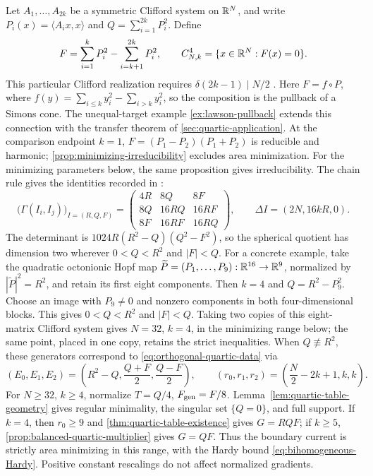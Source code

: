 Let \(A_1,\ldots,A_{2k}\) be a symmetric Clifford system on
\(\mathbb R^N\), and write
\(P_i(x)=\langle A_i x,x\rangle\) and
\(Q=\sum_{i=1}^{2k}P_i^2\). Define
\[
 F=\sum_{i=1}^{k}P_i^2-\sum_{i=k+1}^{2k}P_i^2,
 \qquad C^4_{N,k}=\{x\in\mathbb R^N:F(x)=0\}.
\]
This particular Clifford realization requires
$\delta(2k-1)\mid N/2$ \cite[Section~3.5]{FKM81}.
Here $F=f\circ P$, where
$f(y)=\sum_{i\leq k}y_i^2-\sum_{i>k}y_i^2$, so the composition
is the pullback of a Simons cone. The unequal-target example
\cref{ex:lawson-pullback} extends this connection with the transfer
theorem of \cref{sec:quartic-application}.
At the comparison endpoint \(k=1\),
\(F=(P_1-P_2)(P_1+P_2)\) is reducible and harmonic;
\cref{prop:minimizing-irreducibility} excludes area minimization.
For the minimizing parameters below, the same proposition gives
irreducibility.
The chain rule gives the identities recorded in
\cite[Lemma~5.2.11]{RiedlerThesis25}:
\begin{equation}\label{eq:quartic-ambient-closure}
 \bigl(\Gamma(I_i,I_j)\bigr)_{I=(R,Q,F)}=
 \begin{pmatrix}
 4R&8Q&8F\\
 8Q&16RQ&16RF\\
 8F&16RF&16RQ
 \end{pmatrix},\qquad
 \Delta I=(2N,16kR,0).
\end{equation}
The determinant is \(1024R(R^2-Q)(Q^2-F^2)\), so the spherical
quotient has dimension two wherever \(0<Q<R^2\) and \(|F|<Q\).
For a concrete example, take the quadratic octonionic Hopf map
\(\widetilde P=(P_1,\ldots,P_9):\mathbb R^{16}\to\mathbb R^9\), normalized by
\(|\widetilde P|^2=R^2\), and retain its first eight components.
Then \(k=4\) and \(Q=R^2-P_9^2\). Choose an image with
\(P_9\neq0\) and nonzero components in both four-dimensional blocks.
This gives \(0<Q<R^2\) and \(|F|<Q\). Taking two copies of this
eight-matrix Clifford system gives \(N=32\), \(k=4\), in the
minimizing range below; the same point, placed in one copy, retains
the strict inequalities.
When \(Q\not\equiv R^2\), these generators correspond to
\eqref{eq:orthogonal-quartic-data} via
\[
 (E_0,E_1,E_2)=\left(R^2-Q,\frac{Q+F}{2},\frac{Q-F}{2}\right),
 \qquad (r_0,r_1,r_2)=\left(\frac N2-2k+1,k,k\right).
\]
For $N\ge32$, $k\ge4$, normalize $T=Q/4$, $F_{\rm gen}=F/8$.
Lemma~\ref{lem:quartic-table-geometry} gives regular minimality,
the singular set $\{Q=0\}$, and full support. If $k=4$, then
$r_0\ge9$ and \cref{thm:quartic-table-existence} gives $G=RQF$;
if $k\ge5$, \cref{prop:balanced-quartic-multiplier} gives $G=QF$.
Thus the boundary current is strictly area minimizing in this range,
with the Hardy bound \eqref{eq:bihomogeneous-Hardy}. Positive
constant rescalings do not affect normalized gradients.

